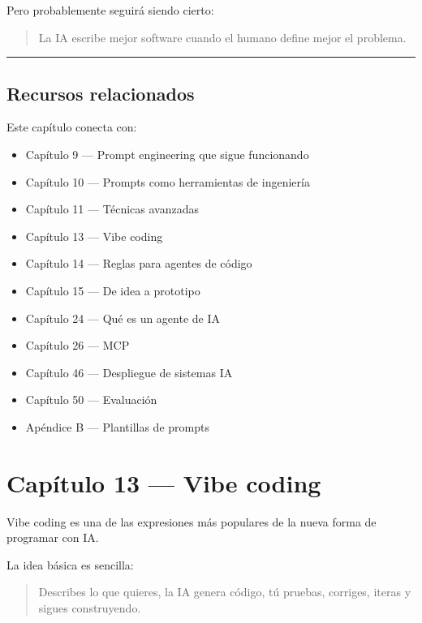 Pero probablemente seguirá siendo cierto:

\begin{quote}
La IA escribe mejor software cuando el humano define mejor el problema.
\end{quote}

\begin{center}\rule{0.5\linewidth}{0.5pt}\end{center}

\section{Recursos relacionados}\label{recursos-relacionados-11}

Este capítulo conecta con:

\begin{itemize}
\tightlist
\item
  Capítulo 9 --- Prompt engineering que sigue funcionando
\item
  Capítulo 10 --- Prompts como herramientas de ingeniería
\item
  Capítulo 11 --- Técnicas avanzadas
\item
  Capítulo 13 --- Vibe coding
\item
  Capítulo 14 --- Reglas para agentes de código
\item
  Capítulo 15 --- De idea a prototipo
\item
  Capítulo 24 --- Qué es un agente de IA
\item
  Capítulo 26 --- MCP
\item
  Capítulo 46 --- Despliegue de sistemas IA
\item
  Capítulo 50 --- Evaluación
\item
  Apéndice B --- Plantillas de prompts
\end{itemize}

\newpage

\chapter{Capítulo 13 --- Vibe coding}\label{capuxedtulo-13-vibe-coding}

Vibe coding es una de las expresiones más populares de la nueva forma de
programar con IA.

La idea básica es sencilla:

\begin{quote}
Describes lo que quieres, la IA genera código, tú pruebas, corriges,
iteras y sigues construyendo.
\end{quote}

